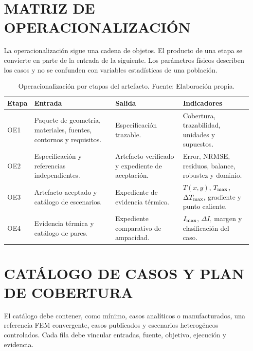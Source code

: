 
\section{MATRIZ DE OPERACIONALIZACIÓN}
\label{anx:operacionalizacion}

La operacionalización sigue una cadena de objetos. El producto de una etapa se convierte en parte de la entrada de la siguiente. Los parámetros físicos describen los casos y no se confunden con variables estadísticas de una población.

\begin{table}[H]
\centering
\caption{Operacionalización por etapas del artefacto. Fuente: Elaboración propia.}
\label{tab:operacionalizacion}
\scriptsize
\setlength{\tabcolsep}{3pt}
\begin{tabularx}{\textwidth}{L{1.0cm}Y Y Y}
\toprule
\textbf{Etapa} & \textbf{Entrada} & \textbf{Salida} & \textbf{Indicadores} \\
\midrule
OE1 & Paquete de geometría, materiales, fuentes, contornos y requisitos. & Especificación trazable. & Cobertura, trazabilidad, unidades y supuestos. \\
OE2 & Especificación y referencias independientes. & Artefacto verificado y expediente de aceptación. & Error, NRMSE, residuos, balance, robustez y dominio. \\
OE3 & Artefacto aceptado y catálogo de escenarios. & Expediente de evidencia térmica. & $T(x,y)$, $T_{\max}$, $\Delta T_{\max}$, gradiente y punto caliente. \\
OE4 & Evidencia térmica y catálogo de pares. & Expediente comparativo de ampacidad. & $I_{\max}$, $\Delta I$, margen y clasificación del caso. \\
\bottomrule
\end{tabularx}
\end{table}

\section{CATÁLOGO DE CASOS Y PLAN DE COBERTURA}
\label{anx:catalogo-casos}

El catálogo debe contener, como mínimo, casos analíticos o manufacturados, una referencia FEM convergente, casos publicados y escenarios heterogéneos controlados. Cada fila debe vincular entradas, fuente, objetivo, ejecución y evidencia.


